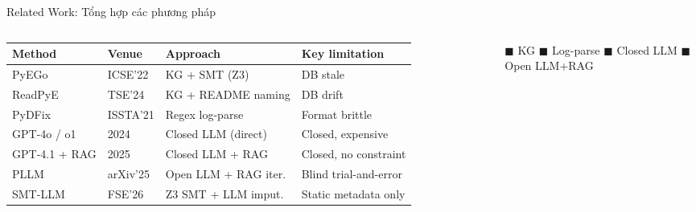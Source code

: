 \documentclass[aspectratio=169,10pt]{beamer}
\begin{document}
\begin{frame}{Related Work: Tổng hợp các phương pháp}
\begin{columns}[c,onlytextwidth]
\tiny
\setlength{\tabcolsep}{3pt}
\renewcommand{\arraystretch}{1.15}
\begin{tabular}{@{}l l l l@{}}
  \toprule
  \textbf{Method} & \textbf{Venue} & \textbf{Approach} & \textbf{Key limitation} \\
  \midrule
  \rowcolor{navydeep!8}
  PyEGo              & ICSE'22  & KG + SMT (Z3)           & DB stale \\
  \rowcolor{navydeep!8}
  ReadPyE            & TSE'24   & KG + README naming      & DB drift \\
  \midrule
  \rowcolor{cSoft!18}
  PyDFix             & ISSTA'21 & Regex log-parse         & Format brittle \\
  \midrule
  \rowcolor{cInferL}
  GPT-4o / o1        & 2024     & Closed LLM (direct)     & Closed, expensive \\
  \rowcolor{cInferL}
  GPT-4.1 + RAG      & 2025     & Closed LLM + RAG        & Closed, no constraint \\
  \midrule
  \rowcolor{success!10}
  PLLM               & arXiv'25 & Open LLM + RAG iter.    & Blind trial-and-error \\
  \rowcolor{success!10}
  SMT-LLM            & FSE'26   & Z3 SMT + LLM imput.     & Static metadata only \\
  \bottomrule
\end{tabular}

\vspace{0.5em}
\tiny
\textcolor{navydeep}{$\blacksquare$} KG \quad
\textcolor{cSoft!65!black}{$\blacksquare$} Log-parse \quad
\textcolor{cInfer}{$\blacksquare$} Closed LLM \quad
\textcolor{success!50!black}{$\blacksquare$} Open LLM+RAG

\centering
{}
\end{columns}
\end{frame}
\end{document}
